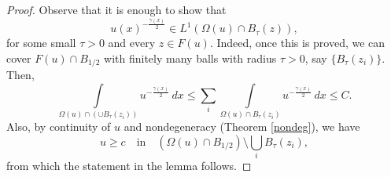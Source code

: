 \documentclass[reqno,11pt]{amsart}
\newcommand{\1}{\mathds{1}}
\numberwithin{equation}{section}
\begin{document}
\begin{proof}
Observe that it is enough to show that
\begin{equation}\label{local_integrability}
    u(x)^{-\frac{\gamma(x)}{2}} \in L^1(\Omega(u) \cap B_\tau(z)), 
\end{equation}
for some small $\tau>0$ and every $z \in F(u)$. Indeed, once this is proved, we can cover $F(u) \cap B_{1/2}$ with finitely many balls with radius $\tau>0$, say $\{B_\tau(z_i) \}$. Then,
$$
    \int\limits_{\Omega(u) \cap \left(\cup B_\tau(z_i)\right)}u^{-\frac{\gamma(x)}{2}}\, dx \leq \sum_{i} \int\limits_{\Omega(u) \cap B_\tau(z_i)}u^{-\frac{\gamma(x)}{2}}\, dx \leq C.
$$
Also, by continuity of $u$ and nondegeneracy (Theorem \ref{nondeg}), we have
$$
    u \geq c \quad \text{in} \quad \left(\Omega(u) \cap B_{1/2} \right) \setminus \bigcup_{i} B_\tau(z_i),
$$
from which the statement in the lemma follows. 


\end{proof}
\end{document}
